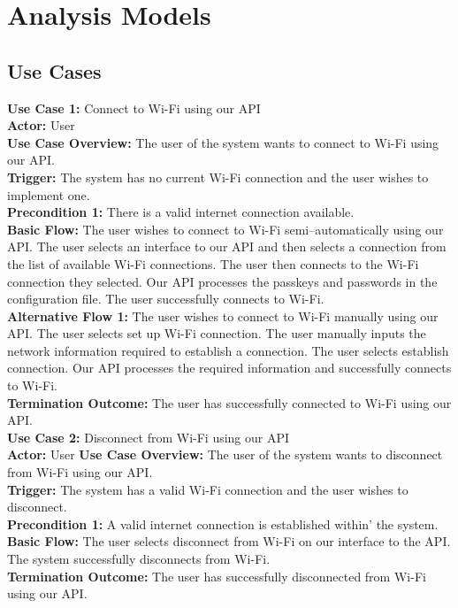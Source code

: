 \section{Analysis Models}
\subsection{Use Cases}

\textbf{Use Case 1:} Connect to Wi-Fi using our API\\ 
\textbf{Actor:} User\\
\textbf{Use Case Overview:} The user of the system wants to connect to Wi-Fi using our API.\\
\textbf{Trigger:} The system has no current Wi-Fi connection and the user wishes to implement one.\\
\textbf{Precondition 1:} There is a valid internet connection available.\\
\textbf{Basic Flow:} The user wishes to connect to Wi-Fi semi–automatically using our API. The user selects 
an interface to our API and then selects a connection from the list of available Wi-Fi connections. The user then connects 
to the Wi-Fi connection they selected. Our API processes the passkeys and passwords in the configuration 
file. The user successfully connects to Wi-Fi.\\
\textbf{Alternative Flow 1:} The user wishes to connect to Wi-Fi manually using our API. The user selects set up Wi-Fi 
connection. The user manually inputs the network information required to establish a connection. The user selects 
establish connection. Our API processes the required information and successfully connects to Wi-Fi.\\
\textbf{Termination Outcome:} The user has successfully connected to Wi-Fi using our API.\\

\textbf{Use Case 2:} Disconnect from Wi-Fi using our API\\
\textbf{Actor:} User
\textbf{Use Case Overview:} The user of the system wants to disconnect from Wi-Fi using our API.\\
\textbf{Trigger:} The system has a valid Wi-Fi connection and the user wishes to disconnect.\\
\textbf{Precondition 1:} A valid internet connection is established within’ the system.\\
\textbf{Basic Flow:} The user selects disconnect from Wi-Fi on our interface to the API. The system successfully disconnects from Wi-Fi.\\
\textbf{Termination Outcome:} The user has successfully disconnected from Wi-Fi using our API.\\
